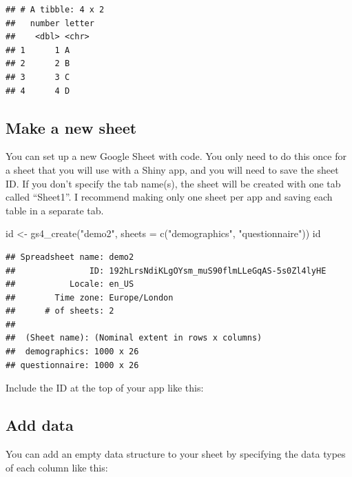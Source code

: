 \documentclass[
  oneside]{book}
\newenvironment{Shaded}{\begin{snugshade}}{\end{snugshade}}
\newcommand{\AttributeTok}[1]{\textcolor[rgb]{0.77,0.63,0.00}{#1}}
\newcommand{\FunctionTok}[1]{\textcolor[rgb]{0.00,0.00,0.00}{#1}}
\newcommand{\NormalTok}[1]{#1}
\newcommand{\OtherTok}[1]{\textcolor[rgb]{0.56,0.35,0.01}{#1}}
\newcommand{\StringTok}[1]{\textcolor[rgb]{0.31,0.60,0.02}{#1}}
\begin{document}
\begin{verbatim}
## # A tibble: 4 x 2
##   number letter
##    <dbl> <chr> 
## 1      1 A     
## 2      2 B     
## 3      3 C     
## 4      4 D
\end{verbatim}

\hypertarget{make-a-new-sheet}{%
\subsection{Make a new sheet}\label{make-a-new-sheet}}

You can set up a new Google Sheet with code. You only need to do this once for a sheet that you will use with a Shiny app, and you will need to save the sheet ID. If you don't specify the tab name(s), the sheet will be created with one tab called ``Sheet1''. I recommend making only one sheet per app and saving each table in a separate tab.

\begin{Shaded}
\begin{Highlighting}[]
\NormalTok{id }\OtherTok{\textless{}{-}} \FunctionTok{gs4\_create}\NormalTok{(}\StringTok{"demo2"}\NormalTok{, }\AttributeTok{sheets =} \FunctionTok{c}\NormalTok{(}\StringTok{"demographics"}\NormalTok{, }\StringTok{"questionnaire"}\NormalTok{))}
\NormalTok{id}
\end{Highlighting}
\end{Shaded}

\begin{verbatim}
## Spreadsheet name: demo2
##               ID: 192hLrsNdiKLgOYsm_muS90flmLLeGqAS-5s0Zl4lyHE
##           Locale: en_US
##        Time zone: Europe/London
##      # of sheets: 2
## 
##  (Sheet name): (Nominal extent in rows x columns)
##  demographics: 1000 x 26
## questionnaire: 1000 x 26
\end{verbatim}

Include the ID at the top of your app like this:

\hypertarget{add-data}{%
\subsection{Add data}\label{add-data}}

You can add an empty data structure to your sheet by specifying the data types of each column like this:
\end{document}

